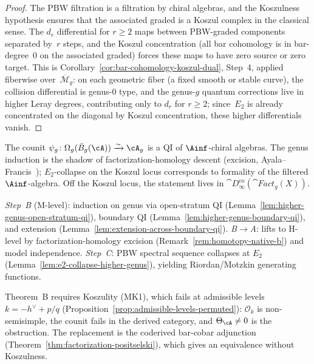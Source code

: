 \begin{proof}
The PBW filtration is a filtration by chiral algebras, and the
Koszulness hypothesis ensures that the associated graded is a
Koszul complex in the classical sense.  The $d_r$ differential
for $r \geq 2$ maps between PBW-graded components separated
by~$r$ steps, and the Koszul concentration (all bar cohomology
is in bar-degree~$0$ on the associated graded) forces these maps
to have zero source or zero target.  This is
Corollary~\ref{cor:bar-cohomology-koszul-dual}, Step~4, applied
fiberwise over~$\overline{\mathcal{M}}_g$: on each geometric
fiber (a fixed smooth or stable curve), the collision differential
is genus-$0$ type, and the genus-$g$ quantum corrections live in
higher Leray degrees, contributing only to $d_r$ for $r \geq 2$;
since~$E_2$ is already concentrated on the diagonal by Koszul
concentration, these higher differentials vanish.
\end{proof}

\begin{remark}\label{rem:homotopy-native-b}
The counit $\psi_g\colon\Omega_g(\bar{B}_g(\cA))\xrightarrow{\sim}\cA_g$
is a QI of $\Ainf$-chiral algebras.
The genus induction is the shadow of factorization-homology descent
(excision, Ayala--Francis~\cite{AF15}); $E_2$-collapse on the Koszul
locus corresponds to formality of the filtered $\Ainf$-algebra.
Off the Koszul locus, the statement lives in
$\cat{D}^{\mathrm{co}}_\infty(\cat{Fact}_g(X))$.
\end{remark}

\begin{remark}
\label{rem:theorem-b-model}
\emph{Step~B} (M-level): induction on genus via open-stratum QI
(Lemma~\ref{lem:higher-genus-open-stratum-qi}), boundary QI
(Lemma~\ref{lem:higher-genus-boundary-qi}), and extension
(Lemma~\ref{lem:extension-across-boundary-qi}).
\emph{B$\to$A}: lifts to H-level by factorization-homology excision
(Remark~\ref{rem:homotopy-native-b}) and model independence.
\emph{Step~C}: PBW spectral sequence collapses at $E_2$
(Lemma~\ref{lem:e2-collapse-higher-genus}), yielding Riordan/Motzkin
generating functions.
\end{remark}

\begin{remark}
\label{rem:admissible-scope-boundary}
Theorem~B requires Koszulity (MK1), which fails at admissible levels
$k=-h^\vee+p/q$ (Proposition~\ref{prop:admissible-levels-permuted}):
$\mathcal{O}_k$ is non-semisimple, the counit fails in the derived
category, and $\Theta_\cA\neq 0$ is the obstruction.
The replacement is the coderived bar-cobar adjunction
(Theorem~\ref{thm:factorization-positselski}), which gives an
equivalence without Koszulness.
\end{remark}

